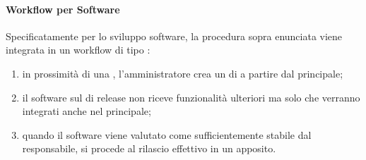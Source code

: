 		\paragraph{Workflow per Software}
		Specificatamente per lo sviluppo software, la procedura sopra enunciata viene integrata in un workflow di tipo :
		\begin{enumerate}
			\item in prossimità di una , l'amministratore crea un  di  a partire dal  principale;
			\item il software sul  di release non riceve funzionalità ulteriori ma solo  che verranno integrati anche nel  principale;
			\item quando il software viene valutato come sufficientemente stabile dal responsabile, si procede al rilascio effettivo in un  apposito.
		\end{enumerate}


